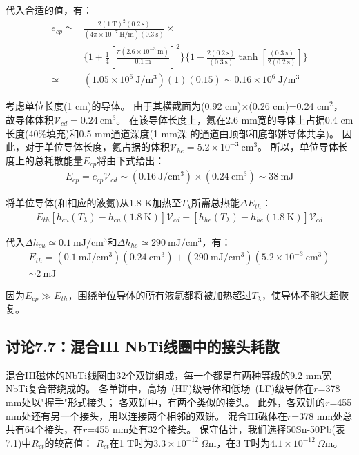 代入合适的值，有：
\begin{align*}%
e_{cp}\simeq&\frac{2(1\ \mathrm{T})^2(0.2\ \mathrm{s})}{(4\pi\times 10^{-7}\ \mathrm{H/m})(0.3\ \mathrm{s})}\times \\
&\{1+\frac{1}{4}\left[\frac{\pi(2.6\times 10^{-3}\ \mathrm{m})}{0.1\ \mathrm{m}}\right]^2\}\{1-\frac{2(0.2\ \mathrm{s})}{(0.3\ \mathrm{s})}\tanh\left[\frac{(0.3\ \mathrm{s})}{2(0.2\ \mathrm{s})}\right]\}  \\
\simeq&(1.05\times 10^6\ \mathrm{J/m^3})(1)(0.15)\sim 0.16\times 10^6\ \mathrm{J/m^3}
\end{align*}

考虑单位长度(1 cm)的导体。
由于其横截面为(0.92 cm)$\times$(0.26 cm)=0.24 $\mathrm{cm^2}$，
故导体体积$\mathcal{V}_{cd}=0.24\ \mathrm{cm^3}$。
在该导体长度上，氦在2.6 mm宽的导体上占据0.4 cm长度(40\%填充)和0.5 mm通道深度(1 mm深
的通道由顶部和底部饼导体共享)。
因此，对于单位导体长度，氦占据的体积$\mathcal{V}_{he}=5.2\times 10^{-3}\ \mathrm{cm^3}$。
所以，单位导体长度上的总耗散能量$E_{cp}$将由下式给出：
\begin{align*}%
E_{cp}=e_{cp}\mathcal{V}_{cd}
\sim(0.16\ \mathrm{J/cm^3})\times(0.24\ \mathrm{cm^3})\sim 38\ \mathrm{mJ} \tag{S7.9}
\end{align*}

将单位导体(和相应的液氦)从1.8 K加热至$T_\lambda$所需总热能$\Delta E_{th}$：
\begin{align*}%
E_{th}[h_{cu}(T_\lambda)-h_{cu}(1.8\ \mathrm{K})]\mathcal{V}_{cd}+[h_{he}(T_\lambda)-h_{he}(1.8\ \mathrm{K})]\mathcal{V}_{cd} \tag{S7.10}
\end{align*}

代入$\Delta h_{cu}\simeq 0.1\ \mathrm{mJ/cm^3}$和$\Delta h_{he}\simeq 290\ \mathrm{mJ/cm^3}$，有：
\begin{align*}%
E_{th}=(0.1\ \mathrm{mJ/cm^3})(0.24\ \mathrm{cm^3})+(290\ \mathrm{mJ/cm^3})(5.2\times 10^{-3}\ \mathrm{cm^3}) \\\tag{S7.11}
\sim 2\ \mathrm{mJ}
\end{align*}

因为$E_{cp}\gg E_{th}$，围绕单位导体的所有液氦都将被加热超过$T_\lambda$，使导体不能失超恢复。



\subsection{讨论7.7：混合III NbTi线圈中的接头耗散}
混合III磁体的NbTi线圈由32个双饼组成，每一个都是有两种等级的9.2 mm宽NbTi复合带绕成的。
各单饼中，高场~(HF)级导体和低场~(LF)级导体在$r$=378 mm处以"握手"形式接头；
各双饼中，有两个类似的接头。
此外，各双饼的$r$=455 mm处还有另一个接头，用以连接两个相邻的双饼。
混合III磁体在$r$=378 mm处总共有64个接头，在$r$=455 mm处有32个接头。
保守估计，我们选择50Sn-50Pb(表7.1)中$R_{ct}$的较高值：
$R_{ct}$在1 T时为$3.3\times 10^{-12}\ \Omega\mathrm{m}$，在3 T时为$4.1\times 10^{-12}\ \Omega \mathrm{m}$。

